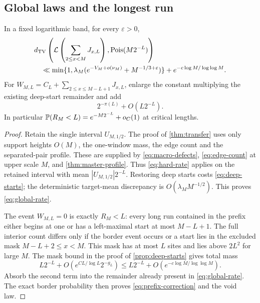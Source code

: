 \subsection{Global laws and the longest run}
\begin{theorem}\label{thm:prefix-poisson}
In a fixed logarithmic band, for every $\varepsilon>0$,
\begin{align}
 &d_{\mathrm{TV}}\left(\mathcal L\left(\sum_{2\le x<M}J_{x,L}\right),\operatorname{Pois}(M2^{-L})\right)
 \notag\\
 &\quad\ll\min\{1,\lambda_M(e^{-V_M+o(\nu_M)}+M^{-1/3+\varepsilon})\}
               +e^{-c\log M/\log\log M}.
               \label{eq:global-rate}
\end{align}
For $W_{M,L}=C_L+\sum_{2\le x\le M-L+1}J_{x,L}$, enlarge the
constant multiplying the existing deep-start remainder and add
\begin{equation}\label{eq:prefix-correction}
 2^{-\pi(L)}+O(L2^{-L}).
\end{equation}
In particular $\mathbb P(R_M<L)=e^{-M2^{-L}}+o_C(1)$ at critical lengths.
\end{theorem}
\begin{proof}
Retain the single interval $U_{M,1/2}$. The proof of
\cref{thm:transfer} uses only support heights $O(M)$, the one-window
mass, the edge count and the separated-pair profile. These are supplied
by \eqref{eq:macro-defects}, \eqref{eq:edge-count} at upper scale $M$,
and \cref{thm:master-profile}. Thus \eqref{eq:hard-rate} applies on the
retained interval with mean $|U_{M,1/2}|2^{-L}$. Restoring deep starts
costs \eqref{eq:deep-starts}; the deterministic target-mean discrepancy
is $O(\lambda_M M^{-1/2})$. This proves \eqref{eq:global-rate}.

The event $W_{M,L}=0$ is exactly $R_M<L$: every long run contained in
the prefix either begins at one or has a left-maximal start at most
$M-L+1$. The full interior count differs only if the border event occurs
or a start lies in the excluded mask $M-L+2\le x<M$.
This mask has at most $L$ sites and lies above $2L^2$ for large $M$.
The mask bound in the proof of \cref{prop:deep-starts} gives total mass
\[
 L2^{-L}+O(e^{CL/\log L}2^{-g_L})
 \le L2^{-L}+O(e^{-c\log M/\log\log M}).
\]
Absorb the second term into the remainder already present in
\eqref{eq:global-rate}. The exact border probability then proves
\eqref{eq:prefix-correction} and the void law.
\end{proof}


